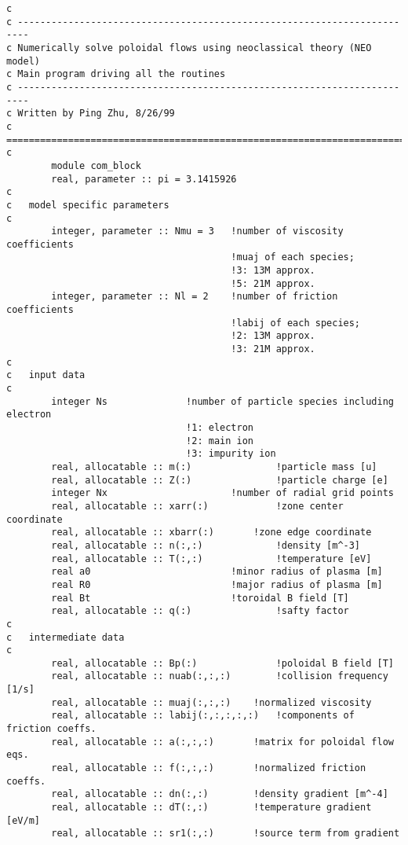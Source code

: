 \begin{verbatim}
c
c ------------------------------------------------------------------------
c Numerically solve poloidal flows using neoclassical theory (NEO model)
c Main program driving all the routines
c ------------------------------------------------------------------------
c Written by Ping Zhu, 8/26/99
c ========================================================================
c
        module com_block
        real, parameter :: pi = 3.1415926
c
c	model specific parameters
c
        integer, parameter :: Nmu = 3   !number of viscosity coefficients
                                        !muaj of each species;
                                        !3: 13M approx.
                                        !5: 21M approx.
        integer, parameter :: Nl = 2    !number of friction coefficients
                                        !labij of each species;
                                        !2: 13M approx.
                                        !3: 21M approx.
c
c	input data
c
        integer Ns              !number of particle species including electron
                                !1: electron
                                !2: main ion
                                !3: impurity ion
        real, allocatable :: m(:)               !particle mass [u]
        real, allocatable :: Z(:)               !particle charge [e]
        integer Nx              		!number of radial grid points
        real, allocatable :: xarr(:)            !zone center coordinate
        real, allocatable :: xbarr(:)   	!zone edge coordinate
        real, allocatable :: n(:,:)             !density [m^-3]
        real, allocatable :: T(:,:)             !temperature [eV]
        real a0                 		!minor radius of plasma [m]
        real R0                 		!major radius of plasma [m]
        real Bt                 		!toroidal B field [T]
        real, allocatable :: q(:)               !safty factor
c
c	intermediate data
c
        real, allocatable :: Bp(:)              !poloidal B field [T]
        real, allocatable :: nuab(:,:,:)        !collision frequency [1/s]
        real, allocatable :: muaj(:,:,:)	!normalized viscosity
        real, allocatable :: labij(:,:,:,:,:)	!components of friction coeffs.
        real, allocatable :: a(:,:,:)		!matrix for poloidal flow eqs.
        real, allocatable :: f(:,:,:)		!normalized friction coeffs.
        real, allocatable :: dn(:,:)		!density gradient [m^-4]
        real, allocatable :: dT(:,:)		!temperature gradient [eV/m]
        real, allocatable :: sr1(:,:)		!source term from gradient

\end{verbatim}
